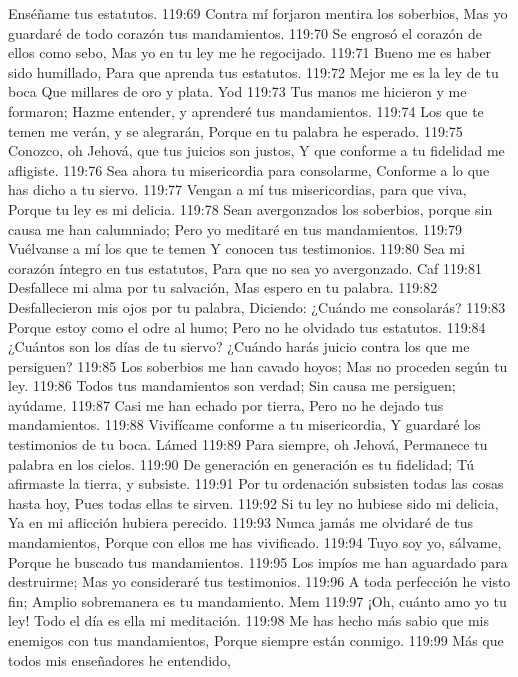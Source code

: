Enséñame tus estatutos. 
119:69 Contra mí forjaron mentira los soberbios, 
Mas yo guardaré de todo corazón tus mandamientos. 
119:70 Se engrosó el corazón de ellos como sebo, 
Mas yo en tu ley me he regocijado. 
119:71 Bueno me es haber sido humillado, 
Para que aprenda tus estatutos. 
119:72 Mejor me es la ley de tu boca 
Que millares de oro y plata. 
Yod 
119:73 Tus manos me hicieron y me formaron; 
Hazme entender, y aprenderé tus mandamientos. 
119:74 Los que te temen me verán, y se alegrarán, 
Porque en tu palabra he esperado. 
119:75 Conozco, oh Jehová, que tus juicios son justos, 
Y que conforme a tu fidelidad me afligiste. 
119:76 Sea ahora tu misericordia para consolarme, 
Conforme a lo que has dicho a tu siervo. 
119:77 Vengan a mí tus misericordias, para que viva, 
Porque tu ley es mi delicia. 
119:78 Sean avergonzados los soberbios, porque sin causa me han calumniado; 
Pero yo meditaré en tus mandamientos. 
119:79 Vuélvanse a mí los que te temen 
Y conocen tus testimonios. 
119:80 Sea mi corazón íntegro en tus estatutos, 
Para que no sea yo avergonzado. 
Caf 
119:81 Desfallece mi alma por tu salvación, 
Mas espero en tu palabra. 
119:82 Desfallecieron mis ojos por tu palabra, 
Diciendo: ¿Cuándo me consolarás? 
119:83 Porque estoy como el odre al humo; 
Pero no he olvidado tus estatutos. 
119:84 ¿Cuántos son los días de tu siervo? 
¿Cuándo harás juicio contra los que me persiguen? 
119:85 Los soberbios me han cavado hoyos; 
Mas no proceden según tu ley. 
119:86 Todos tus mandamientos son verdad; 
Sin causa me persiguen; ayúdame. 
119:87 Casi me han echado por tierra, 
Pero no he dejado tus mandamientos. 
119:88 Vivifícame conforme a tu misericordia, 
Y guardaré los testimonios de tu boca. 
Lámed 
119:89 Para siempre, oh Jehová, 
Permanece tu palabra en los cielos. 
119:90 De generación en generación es tu fidelidad; 
Tú afirmaste la tierra, y subsiste. 
119:91 Por tu ordenación subsisten todas las cosas hasta hoy, 
Pues todas ellas te sirven. 
119:92 Si tu ley no hubiese sido mi delicia, 
Ya en mi aflicción hubiera perecido. 
119:93 Nunca jamás me olvidaré de tus mandamientos, 
Porque con ellos me has vivificado. 
119:94 Tuyo soy yo, sálvame, 
Porque he buscado tus mandamientos. 
119:95 Los impíos me han aguardado para destruirme; 
Mas yo consideraré tus testimonios. 
119:96 A toda perfección he visto fin; 
Amplio sobremanera es tu mandamiento. 
Mem 
119:97 ¡Oh, cuánto amo yo tu ley! 
Todo el día es ella mi meditación. 
119:98 Me has hecho más sabio que mis enemigos con tus mandamientos, 
Porque siempre están conmigo. 
119:99 Más que todos mis enseñadores he entendido, 
